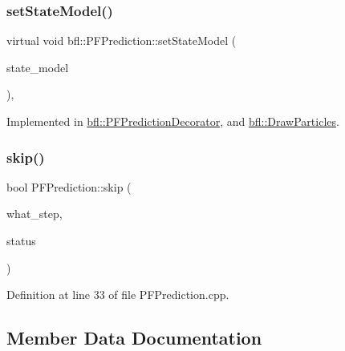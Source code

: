 \subsubsection{\texorpdfstring{set\+State\+Model()}{setStateModel()}\hspace{0.1cm}{\footnotesize\ttfamily [2/2]}}
{\footnotesize\ttfamily virtual void bfl\+::\+P\+F\+Prediction\+::set\+State\+Model (\begin{DoxyParamCaption}\item[{std\+::unique\+\_\+ptr$<$ \mbox{\hyperlink{classbfl_1_1StateModel}{State\+Model}} $>$}]{state\+\_\+model }\end{DoxyParamCaption})\hspace{0.3cm}{\ttfamily [pure virtual]}, {\ttfamily [inherited]}}



Implemented in \mbox{\hyperlink{classbfl_1_1PFPredictionDecorator_ad269dfbdecf19d67717a8bc44f0bd286}{bfl\+::\+P\+F\+Prediction\+Decorator}}, and \mbox{\hyperlink{classbfl_1_1DrawParticles_acb607ab90c22a43a72a75576acb898a4}{bfl\+::\+Draw\+Particles}}.

\mbox{\label{classbfl_1_1PFPrediction_a364cc35a151e5298c4024d681f3e04d9}} 
\subsubsection{\texorpdfstring{skip()}{skip()}}
{\footnotesize\ttfamily bool P\+F\+Prediction\+::skip (\begin{DoxyParamCaption}\item[{const std\+::string \&}]{what\+\_\+step,  }\item[{const bool}]{status }\end{DoxyParamCaption})\hspace{0.3cm}{\ttfamily [inherited]}}



Definition at line 33 of file P\+F\+Prediction.\+cpp.



\subsection{Member Data Documentation}
\mbox{\label{classbfl_1_1GPFPrediction_a2cd16a1045d72c56bbfac5d20d965a03}} 
